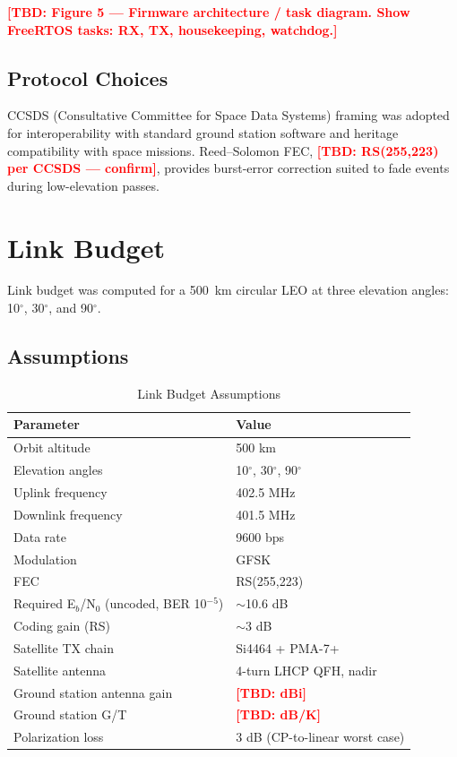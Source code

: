 \documentclass[conference]{IEEEtran}
\newcommand{\tbd}[1]{\textcolor{red}{\textbf{[TBD: #1]}}}
\begin{document}
\tbd{Figure 5 --- Firmware architecture / task diagram. Show FreeRTOS tasks: RX, TX, housekeeping, watchdog.}

\subsection{Protocol Choices}
CCSDS (Consultative Committee for Space Data Systems) framing was adopted for interoperability with standard ground station software and heritage compatibility with space missions. Reed--Solomon FEC, \tbd{RS(255,223) per CCSDS --- confirm}, provides burst-error correction suited to fade events during low-elevation passes.

\section{Link Budget}

Link budget was computed for a 500~km circular LEO at three elevation angles: 10$^\circ$, 30$^\circ$, and 90$^\circ$.

\subsection{Assumptions}

\begin{table}[!t]
\caption{Link Budget Assumptions}
\label{tab:lb_assump}
\centering
\begin{tabular}{ll}
\toprule
\textbf{Parameter} & \textbf{Value} \\
\midrule
Orbit altitude & 500 km \\
Elevation angles & 10$^\circ$, 30$^\circ$, 90$^\circ$ \\
Uplink frequency & 402.5 MHz \\
Downlink frequency & 401.5 MHz \\
Data rate & 9600 bps \\
Modulation & GFSK \\
FEC & RS(255,223) \\
Required E$_b$/N$_0$ (uncoded, BER 10$^{-5}$) & $\sim$10.6 dB \\
Coding gain (RS) & $\sim$3 dB \\
Satellite TX chain & Si4464 + PMA-7+ \\
Satellite antenna & 4-turn LHCP QFH, nadir \\
Ground station antenna gain & \tbd{dBi} \\
Ground station G/T & \tbd{dB/K} \\
Polarization loss & 3 dB (CP-to-linear worst case) \\
\bottomrule
\end{tabular}
\end{table}
\end{document}
